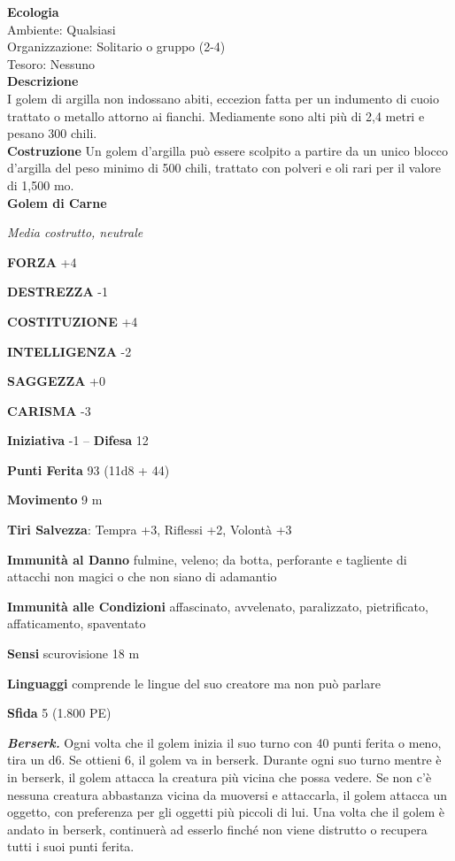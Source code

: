 \begin{multicols}{2}
\textbf{Ecologia}\\
Ambiente: Qualsiasi\\
Organizzazione: Solitario o gruppo (2-4)\\
Tesoro: Nessuno\\
\textbf{Descrizione}\\
I golem di argilla non indossano abiti, eccezion fatta per un indumento di cuoio trattato o metallo attorno ai fianchi. Mediamente sono alti più di 2,4 metri e pesano 300 chili.\\
\textbf{Costruzione}
Un golem d'argilla può essere scolpito a partire da un unico blocco d'argilla del peso minimo di 500 chili, trattato con polveri e oli rari per il valore di 1,500 mo.\\


\medskip{}\textbf{Golem di Carne}

\emph{Media costrutto, neutrale}

\textbf{FORZA} +4

\textbf{DESTREZZA} -1

\textbf{COSTITUZIONE} +4

\textbf{INTELLIGENZA} -2

\textbf{SAGGEZZA} +0

\textbf{CARISMA} -3

\textbf{Iniziativa} -1 -- \textbf{Difesa} 12

\textbf{Punti Ferita} 93 (11d8 + 44)

\textbf{Movimento} 9 m

\textbf{Tiri Salvezza}: Tempra +3, Riflessi +2, Volontà +3

\textbf{Immunità al Danno} fulmine, veleno; da botta, perforante e tagliente di attacchi non magici o che non siano di adamantio

\textbf{Immunità alle Condizioni} affascinato, avvelenato, paralizzato, pietrificato, affaticamento, spaventato

\textbf{Sensi} scurovisione 18 m

\textbf{Linguaggi} comprende le lingue del suo creatore ma non può
parlare

\textbf{Sfida} 5 (1.800 PE)

\emph{\textbf{Berserk.}} Ogni volta che il golem inizia il suo turno con 40 punti ferita o meno, tira un d6. Se ottieni 6, il golem va in berserk. Durante ogni suo turno mentre è in berserk, il golem attacca la creatura più vicina che possa vedere. Se non c'è nessuna creatura abbastanza vicina da muoversi e attaccarla, il golem attacca un oggetto, con preferenza per gli oggetti più piccoli di lui. Una volta che il golem è andato in berserk, continuerà ad esserlo finché non viene distrutto o recupera tutti i suoi punti ferita.


\end{multicols}
